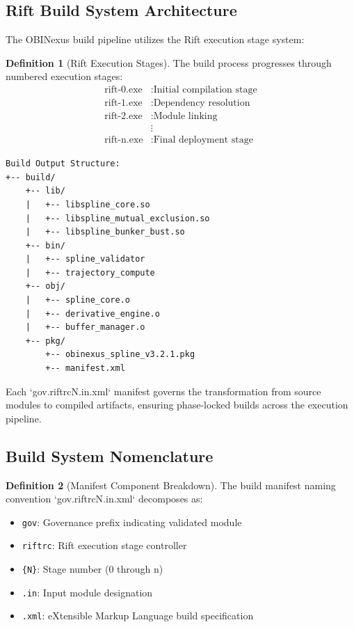 \documentclass[11pt,a4paper]{article}
\theoremstyle{definition}
\newtheorem{definition}{Definition}[section]
\theoremstyle{plain}
\begin{document}
\subsection{Rift Build System Architecture}

The OBINexus build pipeline utilizes the Rift execution stage system:

\begin{definition}[Rift Execution Stages]
The build process progresses through numbered execution stages:
\begin{align}
\text{rift-0.exe} &: \text{Initial compilation stage} \\
\text{rift-1.exe} &: \text{Dependency resolution} \\
\text{rift-2.exe} &: \text{Module linking} \\
&\vdots \\
\text{rift-n.exe} &: \text{Final deployment stage}
\end{align}
\end{definition}

\begin{verbatim}
Build Output Structure:
+-- build/
    +-- lib/
    |   +-- libspline_core.so
    |   +-- libspline_mutual_exclusion.so
    |   +-- libspline_bunker_bust.so
    +-- bin/
    |   +-- spline_validator
    |   +-- trajectory_compute
    +-- obj/
    |   +-- spline_core.o
    |   +-- derivative_engine.o
    |   +-- buffer_manager.o
    +-- pkg/
        +-- obinexus_spline_v3.2.1.pkg
        +-- manifest.xml
\end{verbatim}

Each `gov.riftrc{N}.in.xml` manifest governs the transformation from source modules to compiled artifacts, ensuring phase-locked builds across the execution pipeline.

\subsection{Build System Nomenclature}

\begin{definition}[Manifest Component Breakdown]
The build manifest naming convention `gov.riftrc{N}.in.xml` decomposes as:
\begin{itemize}
    \item \texttt{gov}: Governance prefix indicating validated module
    \item \texttt{riftrc}: Rift execution stage controller
    \item \texttt{\{N\}}: Stage number (0 through n)
    \item \texttt{.in}: Input module designation
    \item \texttt{.xml}: eXtensible Markup Language build specification
\end{itemize}
\end{definition}
\end{document}
